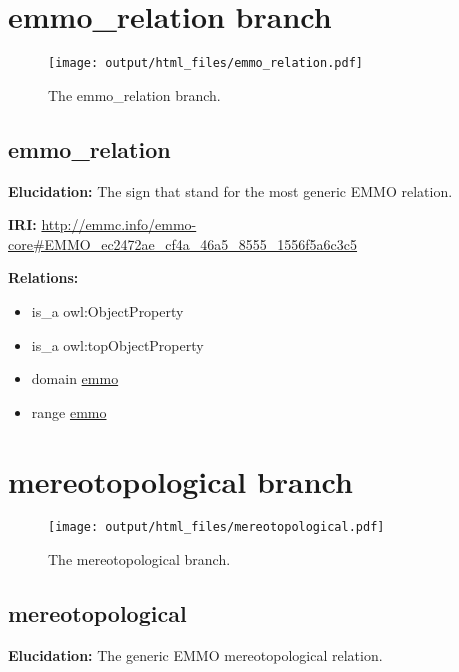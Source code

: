 \documentclass[a4paper,]{report}
\providecommand{\tightlist}{%
  \setlength{\itemsep}{0pt}\setlength{\parskip}{0pt}}
\begin{document}
\hypertarget{emmo_relation-branch}{%
\section{emmo\_relation branch}\label{emmo_relation-branch}}

\begin{figure}
\centering
\texttt{[image: output/html\_files/emmo\_relation.pdf]}
\caption{The emmo\_relation branch.}
\end{figure}

\hypertarget{emmo_relation}{%
\subsection{emmo\_relation}\label{emmo_relation}}

\textbf{Elucidation:} The sign that stand for the most generic EMMO
relation.

\textbf{IRI:}
\url{http://emmc.info/emmo-core\#EMMO_ec2472ae_cf4a_46a5_8555_1556f5a6c3c5}

\textbf{Relations:}

\begin{itemize}
\tightlist
\item
  is\_a owl:ObjectProperty
\item
  is\_a owl:topObjectProperty
\item
  domain \protect\hyperlink{emmo}{emmo}
\item
  range \protect\hyperlink{emmo}{emmo}
\end{itemize}

\hypertarget{mereotopological-branch}{%
\section{mereotopological branch}\label{mereotopological-branch}}

\begin{figure}
\centering
\texttt{[image: output/html\_files/mereotopological.pdf]}
\caption{The mereotopological branch.}
\end{figure}

\hypertarget{mereotopological}{%
\subsection{mereotopological}\label{mereotopological}}

\textbf{Elucidation:} The generic EMMO mereotopological relation.
\end{document}
